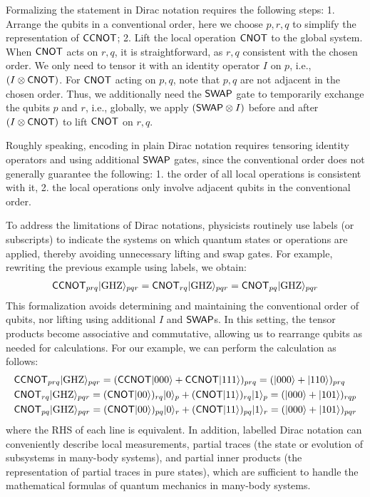 Formalizing the statement in Dirac notation requires the following
steps: 1. Arrange the qubits in a conventional order, here we choose
$p,r,q$ to simplify the representation of ${\mathsf{CCNOT}}$; 2. Lift the local
operation ${\mathsf{CNOT}}$ to the global system. When ${\mathsf{CNOT}}$ acts on $r,q$, it is
straightforward, as $r,q$ consistent with the chosen order. We only need
to tensor it with an identity operator $I$ on $p$, i.e., $(I\otimes
{\mathsf{CNOT}})$.  For ${\mathsf{CNOT}}$ acting on $p,q$, note that $p,q$ are not
adjacent in the chosen order. Thus, we additionally need the ${\mathsf{SWAP}}$ gate to
temporarily exchange the qubits $p$ and $r$, i.e., globally, we apply
$({\mathsf{SWAP}}\otimes I)$ before and after $(I\otimes {\mathsf{CNOT}})$ to lift ${\mathsf{CNOT}}$ on $r,q$.



Roughly speaking, encoding in plain Dirac notation requires
tensoring identity operators and using additional ${\mathsf{SWAP}}$ gates,
since the conventional order does not generally guarantee the following: 1. the order
of all local operations is consistent with it, 2. the local operations
only involve adjacent qubits in the conventional order.

To address the limitations of Dirac notations, physicists routinely
use labels (or subscripts) to indicate the systems on which quantum
states or operations are applied, thereby avoiding unnecessary lifting
and swap gates. For example, rewriting the previous example using labels,
we obtain:
\begin{align*}
  {\mathsf{CCNOT}}_{prq}|{\mathrm{GHZ}}\rangle_{pqr} = 
  {\mathsf{CNOT}}_{rq}|{\mathrm{GHZ}}\rangle_{pqr}
  = {\mathsf{CNOT}}_{pq}|{\mathrm{GHZ}}\rangle_{pqr}
\end{align*}
This formalization avoids determining and maintaining the conventional
order of qubits, nor lifting using additional $I$ and ${\mathsf{SWAP}}$s. In
this setting, the tensor products become associative and
commutative, allowing us to rearrange qubits as needed for
calculations. For our example, we can perform the calculation as
follows:
\begin{align*}
  &{\mathsf{CCNOT}}_{prq}|{\mathrm{GHZ}}\rangle_{pqr}
  = ({\mathsf{CCNOT}}|000\rangle + {\mathsf{CCNOT}}|111\rangle)_{prq}
  = (|000\rangle + |110\rangle)_{prq}\\
  &{\mathsf{CNOT}}_{rq}|{\mathrm{GHZ}}\rangle_{pqr}
  = ({\mathsf{CNOT}}|00\rangle)_{rq}|0\rangle_p + ({\mathsf{CNOT}}|11\rangle)_{rq}|1\rangle_p
  =(|000\rangle + |101\rangle)_{rqp}\\
  &{\mathsf{CNOT}}_{pq}|{\mathrm{GHZ}}\rangle_{pqr}
  = ({\mathsf{CNOT}}|00\rangle)_{pq}|0\rangle_r + ({\mathsf{CNOT}}|11\rangle)_{pq}|1\rangle_r
  = (|000\rangle + |101\rangle)_{pqr}
\end{align*}
where the RHS of each line is equivalent.  In addition, labelled
Dirac notation can conveniently describe local measurements, partial
traces (the state or evolution of subsystems in many-body systems),
and partial inner products (the representation of partial traces in
pure states), which are sufficient to handle the mathematical formulas
of quantum mechanics in many-body systems.

